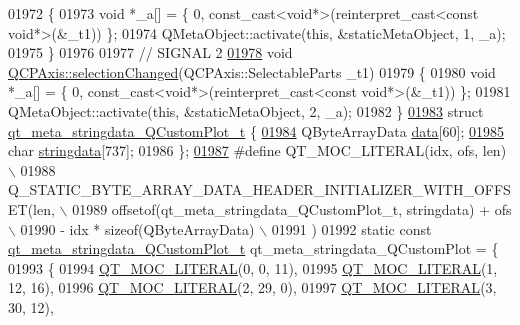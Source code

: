 \begin{DoxyCode}
01972 \{
01973     \textcolor{keywordtype}{void} *\_a[] = \{ 0, \textcolor{keyword}{const\_cast<}\textcolor{keywordtype}{void}*\textcolor{keyword}{>}(\textcolor{keyword}{reinterpret\_cast<}\textcolor{keyword}{const }\textcolor{keywordtype}{void}*\textcolor{keyword}{>}(&\_t1)) \};
01974     QMetaObject::activate(\textcolor{keyword}{this}, &staticMetaObject, 1, \_a);
01975 \}
01976 
01977 \textcolor{comment}{// SIGNAL 2}
\hypertarget{a00067_source_l01978}{}\hyperlink{a00025_aece2d803d07dba9dc2ea96fcad186e34}{01978} \textcolor{keywordtype}{void} \hyperlink{a00025_aece2d803d07dba9dc2ea96fcad186e34}{QCPAxis::selectionChanged}(QCPAxis::SelectableParts \_t1)
01979 \{
01980     \textcolor{keywordtype}{void} *\_a[] = \{ 0, \textcolor{keyword}{const\_cast<}\textcolor{keywordtype}{void}*\textcolor{keyword}{>}(\textcolor{keyword}{reinterpret\_cast<}\textcolor{keyword}{const }\textcolor{keywordtype}{void}*\textcolor{keyword}{>}(&\_t1)) \};
01981     QMetaObject::activate(\textcolor{keyword}{this}, &staticMetaObject, 2, \_a);
01982 \}
\hypertarget{a00067_source_l01983}{}\hyperlink{a00067}{01983} \textcolor{keyword}{struct }\hyperlink{a00067_dd/ded/a00211}{qt\_meta\_stringdata\_QCustomPlot\_t} \{
\hypertarget{a00067_source_l01984}{}\hyperlink{a00067_a294e0b700c66ea0a3f528f255fa52fff}{01984}     QByteArrayData \hyperlink{a00067_a294e0b700c66ea0a3f528f255fa52fff}{data}[60];
\hypertarget{a00067_source_l01985}{}\hyperlink{a00067_a06c7bf819765fdc7a40739cfb2bb681c}{01985}     \textcolor{keywordtype}{char} \hyperlink{a00067_a06c7bf819765fdc7a40739cfb2bb681c}{stringdata}[737];
01986 \};
\hypertarget{a00067_source_l01987}{}\hyperlink{a00067_a75bb9482d242cde0a06c9dbdc6b83abe}{01987} \textcolor{preprocessor}{#define QT\_MOC\_LITERAL(idx, ofs, len) \(\backslash\)}
01988 \textcolor{preprocessor}{    Q\_STATIC\_BYTE\_ARRAY\_DATA\_HEADER\_INITIALIZER\_WITH\_OFFSET(len, \(\backslash\)}
01989 \textcolor{preprocessor}{    offsetof(qt\_meta\_stringdata\_QCustomPlot\_t, stringdata) + ofs \(\backslash\)}
01990 \textcolor{preprocessor}{        - idx * sizeof(QByteArrayData) \(\backslash\)}
01991 \textcolor{preprocessor}{    )}
01992 \textcolor{keyword}{static} \textcolor{keyword}{const} \hyperlink{a00067_dd/ded/a00211}{qt\_meta\_stringdata\_QCustomPlot\_t} 
      qt\_meta\_stringdata\_QCustomPlot = \{
01993     \{
01994 \hyperlink{a00067_a75bb9482d242cde0a06c9dbdc6b83abe}{QT\_MOC\_LITERAL}(0, 0, 11),
01995 \hyperlink{a00067_a75bb9482d242cde0a06c9dbdc6b83abe}{QT\_MOC\_LITERAL}(1, 12, 16),
01996 \hyperlink{a00067_a75bb9482d242cde0a06c9dbdc6b83abe}{QT\_MOC\_LITERAL}(2, 29, 0),
01997 \hyperlink{a00067_a75bb9482d242cde0a06c9dbdc6b83abe}{QT\_MOC\_LITERAL}(3, 30, 12),

\end{DoxyCode}
